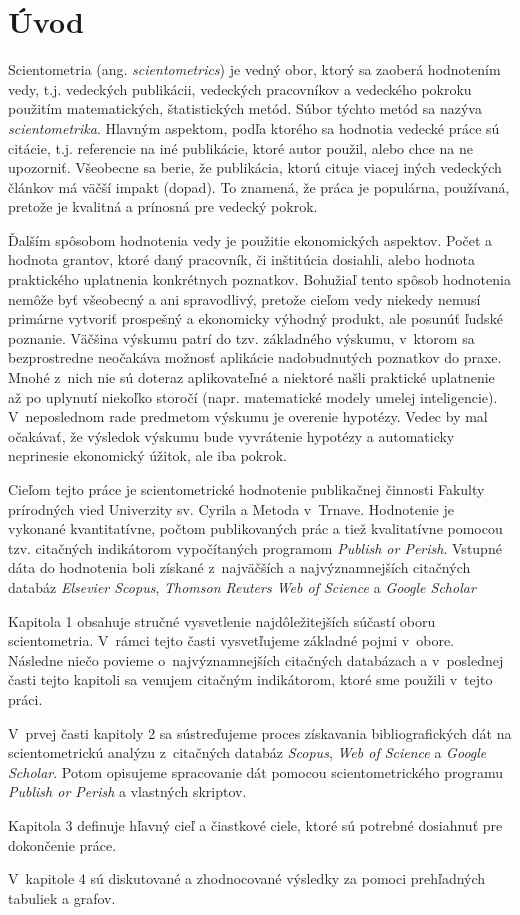 \chapter*{Úvod}

Scientometria (ang. \emph{scientometrics}) je vedný obor, ktorý sa zaoberá
hodnotením vedy, t.j. vedeckých publikácii, vedeckých pracovníkov a vedeckého
pokroku použitím matematických, štatistických metód.  Súbor týchto metód sa
nazýva \emph{scientometrika}.  Hlavným aspektom, podľa ktorého sa hodnotia
vedecké práce sú citácie, t.j. referencie na iné publikácie, ktoré autor
použil, alebo chce na ne upozorniť.  Všeobecne sa berie, že publikácia, ktorú
cituje viacej iných vedeckých článkov má väčší impakt (dopad).  To znamená, že
práca je populárna, používaná, pretože je kvalitná a prínosná pre vedecký
pokrok.

Ďalším spôsobom hodnotenia vedy je použitie ekonomických aspektov.  Počet a
hodnota grantov, ktoré daný pracovník, či inštitúcia dosiahli, alebo hodnota
praktického uplatnenia konkrétnych poznatkov.  Bohužiaľ tento spôsob hodnotenia
nemôže byť všeobecný a ani spravodlivý, pretože cieľom vedy niekedy nemusí
primárne vytvoriť prospešný a ekonomicky výhodný produkt, ale posunúť ľudské
poznanie.  Väčšina výskumu patrí do tzv.  základného výskumu, v~ktorom sa
bezprostredne neočakáva možnosť aplikácie nadobudnutých poznatkov do praxe.
Mnohé z~nich nie sú doteraz aplikovateľné a niektoré našli praktické uplatnenie
až po uplynutí niekoľko storočí (napr. matematické modely umelej inteligencie).
V~neposlednom rade predmetom výskumu je overenie hypotézy.  Vedec by mal
očakávať, že výsledok výskumu bude vyvrátenie hypotézy a automaticky neprinesie
ekonomický úžitok, ale iba pokrok.  

Cieľom tejto práce je scientometrické hodnotenie publikačnej činnosti Fakulty
prírodných vied Univerzity sv. Cyrila a Metoda v~Trnave.  Hodnotenie je
vykonané kvantitatívne, počtom publikovaných prác a tiež kvalitatívne pomocou
tzv. citačných indikátorom vypočítaných programom \emph{Publish or Perish}.
Vstupné dáta do hodnotenia boli získané z~najväčších a najvýznamnejších
citačných databáz \emph{Elsevier Scopus}, \emph{Thomson Reuters Web of Science}
a \emph{Google Scholar}

Kapitola 1 obsahuje stručné vysvetlenie najdôležitejších súčastí oboru
 scientometria. V~rámci tejto časti vysvetľujeme základné pojmi v~obore.
Následne niečo povieme o~najvýznamnejších citačných databázach a v~poslednej
časti tejto kapitoli sa venujem citačným indikátorom, ktoré sme použili
v~tejto práci.

V~prvej časti kapitoly 2 sa sústreďujeme  proces získavania bibliografických
dát na scientometrickú analýzu z~citačných databáz \emph{Scopus}, \emph{Web of
Science} a \emph{Google Scholar}.  Potom opisujeme spracovanie dát pomocou
scientometrického programu \emph{Publish or Perish} a vlastných skriptov.

Kapitola 3 definuje hľavný cieľ a čiastkové ciele, ktoré sú potrebné dosiahnuť
pre dokončenie práce.

V~kapitole 4 sú diskutované a zhodnocované  výsledky za pomoci prehľadných
tabuliek a grafov.

